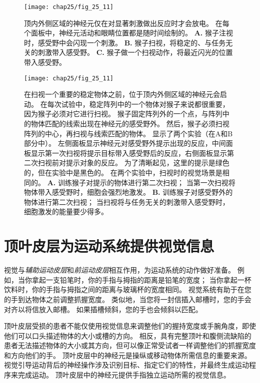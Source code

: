 \begin{figure}[htbp]
	\centering
	\texttt{[image: chap25/fig\_25\_11]}
	\caption{顶内外侧区域的神经元仅在对显著刺激做出反应时才会放电。
		在每个面板中，神经元活动和眼睛位置都是随时间绘制的。
		\textbf{A.} 猴子注视时，感受野中会闪现一个刺激。
		\textbf{B.} 猴子扫视，将稳定的、与任务无关的刺激带入感受野。
		\textbf{C.} 猴子做一个扫视动作，将最近闪光的位置带入感受野。}
	\label{fig:25_11}
\end{figure}


\begin{figure}[htbp]
	\centering
	\texttt{[image: chap25/fig\_25\_11]}
	\caption{在扫视一个重要的稳定物体之前，位于顶内外侧区域的神经元会启动。
		在每次试验中，稳定阵列中的一个物体对猴子来说都很重要，因为猴子必须对它进行扫视。
		猴子固定阵列外的一个点，与阵列中的物体匹配的线索出现在神经元的感受野外。
		然后，猴子必须扫视阵列的中心，再扫视与线索匹配的物体。
		显示了两个实验（在A和B部分中）。
		左侧面板显示神经元对感受野外提示出现的反应，中间面板显示第一次扫视将提示目标带入感受野后的反应，右侧面板显示第二次扫视前对提示对象的反应。
		为了清晰起见，这里的提示是绿色的，但在实验中是黑色的。
		在两个实验中，扫视时的视觉场景是相同的。
		\textbf{A.} 训练猴子对提示的物体进行第二次扫视；
		当第一次扫视将物体带入感受野时，细胞会强烈地激发。
		\textbf{B.} 训练猴子对感受野外的物体进行第二次扫视；
		当扫视将与任务无关的刺激带入感受野时，细胞激发的能量要少得多。}
	\label{fig:25_12}
\end{figure}



\section{顶叶皮层为运动系统提供视觉信息}

视觉与\textit{辅助运动皮层}和\textit{前运动皮层}相互作用，为运动系统的动作做好准备。
例如，当你拿起一支铅笔时，你的手指与拇指的距离是铅笔的宽度；
当你拿起一杯饮料时，你的手指与拇指之间的距离与玻璃杯的宽度相同。
视觉系统有助于在您的手到达物体之前调整抓握宽度。
类似地，当您将一封信插入邮槽时，您的手会对齐以将信放入邮槽。
如果插槽倾斜，您的手也会倾斜以匹配。


顶叶皮层受损的患者不能仅使用视觉信息来调整他们的握持宽度或手腕角度，即使他们可以口头描述物体的大小或槽的方向。
相反，具有完整顶叶和腹侧流缺陷的患者无法描述物体的大小或其方向，但可以像正常受试者一样调整他们的抓握宽度和方向他们的手。
顶叶皮层中的神经元是操纵或移动物体所需信息的重要来源。
视觉引导运动背后的神经操作涉及识别目标、指定它们的特性，并最终生成运动程序来完成运动。
顶叶皮层中的神经元提供手指独立运动所需的视觉信息。


